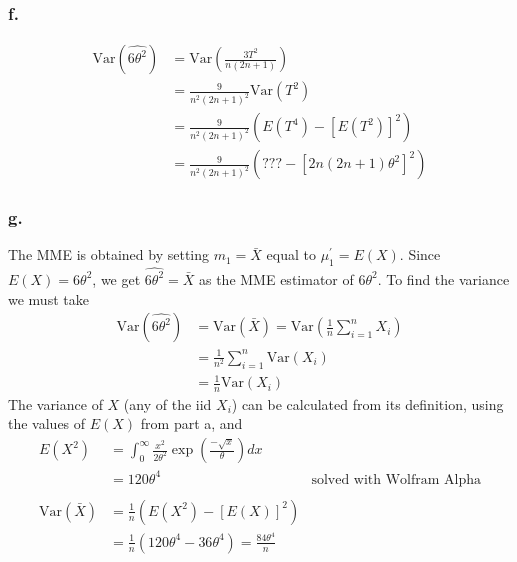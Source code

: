\documentclass{article}
\begin{document}
\subsubsection*{f.}
\begin{align*}
\mathrm{Var}\left(\widehat{6\theta^2}\right) &= \mathrm{Var}\left(\frac{3T^2}{n(2n+1)}\right)\\
&= \frac{9}{n^2(2n+1)^2}\mathrm{Var}(T^2) \\
&=\frac{9}{n^2(2n+1)^2} \left(E(T^4)-\left[E(T^2)\right]^2\right) \\
&=\frac{9}{n^2(2n+1)^2} \left( ??? - \left[2n(2n+1)\theta^2\right]^2\right)
\end{align*}


\subsubsection*{g.}
The MME is obtained by setting $m_1=\bar{X}$ equal to $\mu_1^\prime = E(X)$. Since $E(X) = 6\theta^2$, we get $\widehat{6\theta^2} = \bar{X}$ as the MME estimator of $6\theta^2$. To find the variance we must take 
\begin{align*}
\mathrm{Var}\left(\widehat{6\theta^2}\right) &= \mathrm{Var}(\bar{X}) = \mathrm{Var}\left(\frac{1}{n}\sum_{i=1}^n X_i\right) \\
&= \frac{1}{n^2}\sum_{i=1}^n \mathrm{Var}(X_i) \\
&= \frac{1}{n}\mathrm{Var}(X_i)
\end{align*}
The variance of $X$ (any of the iid $X_i$) can be calculated from its definition, using the values of $E(X)$ from part a, and
\begin{align*}
E(X^2) &= \int_0^\infty \frac{x^2}{2\theta^2}\exp\left(\frac{-\sqrt{x}}{\theta}\right)dx \\
&=120\theta^4 &\text{solved with Wolfram Alpha}\\ \\
\mathrm{Var}(\bar{X}) &= \frac{1}{n}\left(E(X^2) - \left[E(X)\right]^2\right) \\
&=\frac{1}{n}\left(120\theta^4-36\theta^4\right) = \frac{84\theta^4}{n} \\
\end{align*}

\pagebreak
\end{document}

